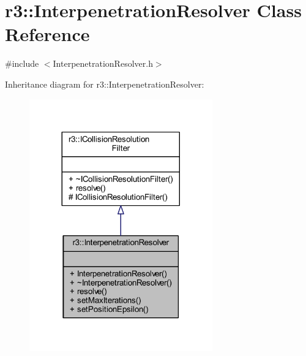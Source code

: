\hypertarget{classr3_1_1_interpenetration_resolver}{}\section{r3\+:\+:Interpenetration\+Resolver Class Reference}
\label{classr3_1_1_interpenetration_resolver}


{\ttfamily \#include $<$Interpenetration\+Resolver.\+h$>$}



Inheritance diagram for r3\+:\+:Interpenetration\+Resolver\+:\nopagebreak
\begin{figure}[H]
\begin{center}
\leavevmode
\includegraphics[width=224pt]{classr3_1_1_interpenetration_resolver__inherit__graph}
\end{center}
\end{figure}


